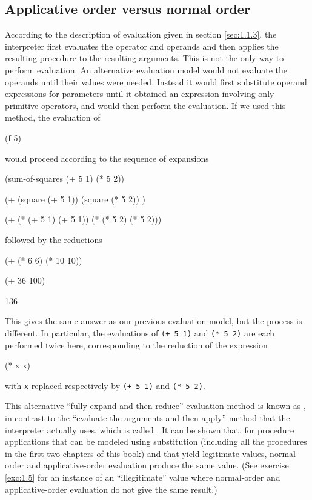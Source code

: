 \begin{schemedisplay}
\subsection*{Applicative order versus normal order}

According to the description of evaluation given in section
\ref{sec:1.1.3}, the interpreter first evaluates the operator and operands
and then applies the resulting procedure to the resulting arguments.
This is not the only way to perform evaluation.  An alternative
evaluation model would not evaluate the operands until their values
were needed.  Instead it would first substitute operand expressions
for parameters until it obtained an expression involving only
primitive operators, and would then perform the evaluation.  If we
used this method, the evaluation of

\begin{schemedisplay}
(f 5)
\end{schemedisplay}

\noindent would proceed according to the sequence of expansions

\begin{schemedisplay}
(sum-of-squares (+ 5 1) (* 5 2))

(+    (square (+ 5 1))      (square (* 5 2))  )

(+    (* (+ 5 1) (+ 5 1))   (* (* 5 2) (* 5 2)))
\end{schemedisplay}

\noindent followed by the reductions

\begin{schemedisplay}
(+         (* 6 6)             (* 10 10))

(+           36                   100)

                    136
\end{schemedisplay}

This gives the same answer as our previous evaluation model, but the
process is different.  In particular, the evaluations
of \texttt{(+ 5 1)} and \texttt{(* 5 2)} are each performed twice here,
corresponding to the reduction of the expression

\begin{schemedisplay}
(* x x)
\end{schemedisplay}

\noindent with \texttt{x} replaced respectively by \texttt{(+ 5 1)} and \texttt{(* 5 2)}.

This alternative ``fully expand and then reduce'' evaluation method is
known as , in contrast to the ``evaluate
the arguments and then apply'' method that the interpreter actually
uses, which is called .  It can be
shown that, for procedure applications that can be modeled using
substitution (including all the procedures in the first two chapters
of this book) and that yield legitimate values, normal-order and
applicative-order evaluation produce the same value.  (See exercise
\ref{exc:1.5} for an instance of an ``illegitimate'' value where
normal-order and applicative-order evaluation do not give the same
result.)


\end{schemedisplay}
